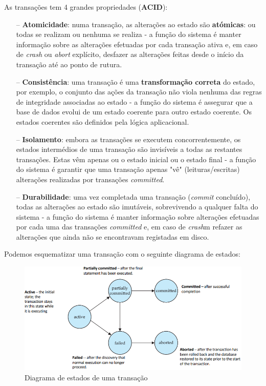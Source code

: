 \documentclass[oneside]{book}
\theoremstyle{definition}
\begin{document}
As transações tem 4 grandes propriedades (\textbf{ACID}):
\begin{itemize}
    \itemsep0cm
    \item[--] \textbf{Atomicidade}: numa transação, as alterações ao estado são \textbf{atómicas}: ou todas se realizam ou nenhuma se realiza - a função do sistema é manter informação sobre as alterações efetuadas por cada transação ativa e, em caso de \textit{crash} ou \textit{abort} explícito, desfazer as alterações feitas desde o início da transação até ao ponto de rutura.
    \item[--] \textbf{Consistência}: uma transação é uma \textbf{transformação correta} do estado, por exemplo, o conjunto das ações da transação não viola nenhuma das regras de integridade associadas ao estado - a função do sistema é assegurar que a base de dados evolui de um estado coerente para outro estado coerente. Os estados coerentes são definidos pela lógica aplicacional.
    \item[--] \textbf{Isolamento}: embora as transações se executem concorrentemente, os estados intermédios de uma transação são invisíveis a todas as restantes transações. Estas vêm apenas ou o estado inicial ou o estado final - a função do sistema é garantir que uma transação apenas "vê" (leituras/escritas) alterações realizadas por transações \textit{committed}.
    \item[--] \textbf{Durabilidade}: uma vez completada uma transação (\textit{commit} concluído), todas as alterações ao estado são imutáveis, sobrevivendo a qualquer falta do sistema - a função do sistema é manter informação sobre alterações efetuadas por cada uma das transações \textit{committed} e, em caso de \textit{crash}m refazer as alterações que ainda não se encontravam registadas em disco.
\end{itemize}

Podemos esquematizar uma transação com o seguinte diagrama de estados:
\begin{figure}[H]
    \centering
    \includegraphics[scale = 0.4]{cap3/diagrama_estados_trans.png}
    \caption{Diagrama de estados de uma transação}
\end{figure}
\end{document}
